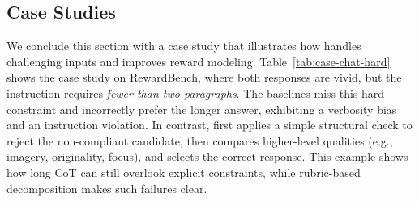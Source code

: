 \subsection{Case Studies}
\label{subsec:case-study}
We conclude this section with a case study that illustrates how {\name} handles challenging inputs and improves reward modeling. 
Table~\ref{tab:case-chat-hard} shows the case study on RewardBench, where both responses are vivid, but the instruction requires \emph{fewer than two paragraphs}. The baselines miss this hard constraint and incorrectly prefer the longer answer, exhibiting a verbosity bias and an instruction violation. In contrast, \modelname{} first applies a simple structural check to reject the non-compliant candidate, then compares higher-level qualities (e.g., imagery, originality, focus), and selects the correct response. This example shows how long CoT can still overlook explicit constraints, while rubric-based decomposition makes such failures clear. 






